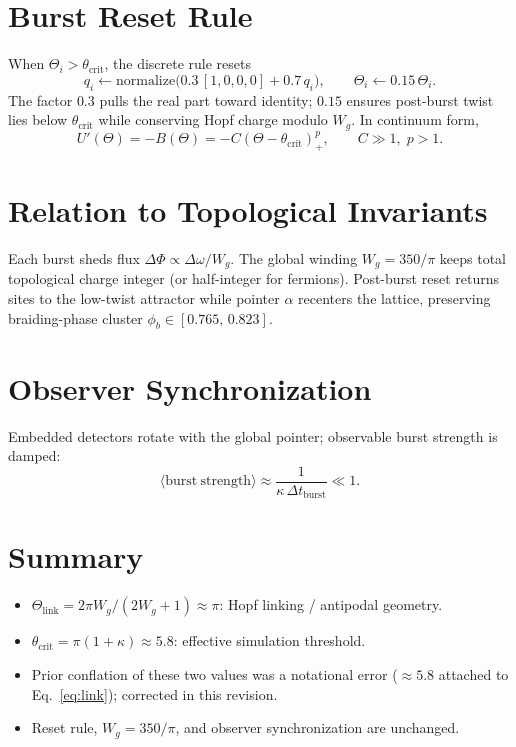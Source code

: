 \documentclass[11pt]{article}
\begin{document}
\section{Burst Reset Rule}

When $\Theta_i > \theta_{\mathrm{crit}}$, the discrete rule resets
\[
q_i \leftarrow \mathrm{normalize}\bigl(0.3\,[1,0,0,0] + 0.7\,q_i\bigr),
\qquad
\Theta_i \leftarrow 0.15\,\Theta_i.
\]
The factor $0.3$ pulls the real part toward identity; $0.15$ ensures post-burst twist lies below
$\theta_{\mathrm{crit}}$ while conserving Hopf charge modulo $W_g$. In continuum form,
\[
U'(\Theta) = -B(\Theta) = -C(\Theta - \theta_{\mathrm{crit}})_+^p, \qquad C \gg 1,\; p>1.
\]

\section{Relation to Topological Invariants}

Each burst sheds flux $\Delta\Phi \propto \Delta\omega / W_g$. The global winding
$W_g = 350/\pi$ keeps total topological charge integer (or half-integer for fermions).
Post-burst reset returns sites to the low-twist attractor while pointer $\alpha$ recenters the
lattice, preserving braiding-phase cluster $\phi_b \in [0.765,\,0.823]$.

\section{Observer Synchronization}

Embedded detectors rotate with the global pointer; observable burst strength is damped:
\[
\langle \mathrm{burst\ strength} \rangle \approx \frac{1}{\kappa\,\Delta t_{\mathrm{burst}}} \ll 1.
\]

\section{Summary}

\begin{itemize}
\item $\Theta_{\mathrm{link}} = 2\pi W_g/(2W_g+1) \approx \pi$: Hopf linking / antipodal geometry.
\item $\theta_{\mathrm{crit}} = \pi(1+\kappa) \approx 5.8$: effective simulation threshold.
\item Prior conflation of these two values was a notational error ($\approx 5.8$ attached to
      Eq.~\eqref{eq:link}); corrected in this revision.
\item Reset rule, $W_g = 350/\pi$, and observer synchronization are unchanged.
\end{itemize}
\end{document}
